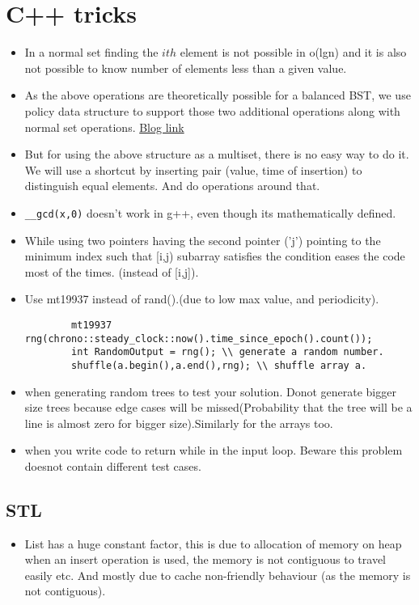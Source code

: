 \documentclass[../Notes.tex]{subfiles}
\begin{document}
\chapter{C++ tricks}

\begin{itemize}
	\item In a normal set finding the $ith$ element is not possible in o(lgn)
	and it is also not possible to know number of elements less than a given value.
	\item As the above operations are theoretically possible for a balanced BST, we use policy data structure to support those two additional operations along with normal set operations. \href{https://codeforces.com/blog/entry/11080}{Blog link}
	\item But for using the above structure as a multiset, there is no easy way to do it. We will use a shortcut by inserting pair (value, time of insertion) to distinguish equal elements. And do operations around that.
	\item \texttt{\_\_gcd(x,0)} doesn't work in g++, even though its mathematically defined.
	\item While using two pointers having the second pointer ('j') pointing to the minimum index such that [i,j) subarray satisfies the condition eases the code most of the times. (instead of [i,j]).
	\item Use mt19937 instead of rand().(due to low max value, and periodicity).
	\begin{lstlisting}
		mt19937 rng(chrono::steady_clock::now().time_since_epoch().count());
		int RandomOutput = rng(); \\ generate a random number.
		shuffle(a.begin(),a.end(),rng); \\ shuffle array a.
	\end{lstlisting}
	\item when generating random trees to test your solution. Donot generate bigger size trees because edge cases will be missed(Probability that the tree will be a line is almost zero for bigger size).Similarly for the arrays too.
	\item when you write code to return while in the input loop. Beware this problem doesnot contain different test cases.
\end{itemize}

\section{STL}
\begin{itemize}
	\item List has a huge constant factor, this is due to allocation of memory on heap when an insert operation is used, the memory is not contiguous to travel easily etc. And mostly due to cache non-friendly behaviour (as the memory is not contiguous).
\end{itemize}
\end{document}
